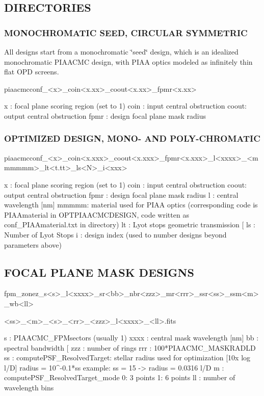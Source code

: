 \subsection*{D\+I\+R\+E\+C\+T\+O\+R\+I\+E\+S}

\subsubsection*{M\+O\+N\+O\+C\+H\+R\+O\+M\+A\+T\+I\+C S\+E\+E\+D, C\+I\+R\+C\+U\+L\+A\+R S\+Y\+M\+M\+E\+T\+R\+I\+C}

All designs start from a monochromatic \char`\"{}seed\char`\"{} design, which is an idealized monochromatic P\+I\+A\+A\+C\+M\+C design, with P\+I\+A\+A optics modeled as infinitely thin flat O\+P\+D screens.

\begin{DoxyVerb}piaacmcconf_<x>_coin<x.xx>_coout<x.xx>_fpmr<x.xx>

x    : focal plane scoring region (set to 1) 
coin : input central obstruction
coout: output central obstruction
fpmr : design focal plane mask radius
\end{DoxyVerb}


\subsubsection*{O\+P\+T\+I\+M\+I\+Z\+E\+D D\+E\+S\+I\+G\+N, M\+O\+N\+O-\/ A\+N\+D P\+O\+L\+Y-\/\+C\+H\+R\+O\+M\+A\+T\+I\+C}

\begin{DoxyVerb}piaacmcconf_<x>_coin<x.xxx>_coout<x.xxx>_fpmr<x.xxx>_l<xxxx>_<mmmmmm>_lt<t.tt>_ls<N>_i<xxx>

x    : focal plane scoring region (set to 1) 
coin : input central obstruction
coout: output central obstruction
fpmr : design focal plane mask radius
l    : central wavelength [nm]
mmmmm: material used for PIAA optics (corresponding code is PIAAmaterial in OPTPIAACMCDESIGN, code written as conf_PIAAmaterial.txt in directory)
lt   : Lyot stops geometric transmission [%
ls   : Number of Lyot Stops
i    : design index (used to number designs beyond parameters above)
\end{DoxyVerb}


\subsection*{F\+O\+C\+A\+L P\+L\+A\+N\+E M\+A\+S\+K D\+E\+S\+I\+G\+N\+S}

\begin{DoxyVerb}fpm_zonez_s<s>_l<xxxx>_sr<bb>_nbr<zzz>_mr<rrr>_ssr<ss>_ssm<m>_wb<ll>

<ss>_<m>_<s>_<rr>_<zzz>_l<xxxx>_<ll>.fits


s    : PIAACMC_FPMsectors (usually 1)
xxxx : central mask wavelength [nm]
bb   : spectral bandwidth [%
zzz  : number of rings
rrr  : 100*PIAACMC_MASKRADLD
ss   : computePSF_ResolvedTarget: stellar radius used for optimization  [10x log l/D]
    radius = 10^{-0.1*ss}
    example: ss = 15  ->  radius = 0.0316 l/D
m    : computePSF_ResolvedTarget_mode
    0: 3 points
    1: 6 points
ll   : number of wavelength bins
\end{DoxyVerb}


